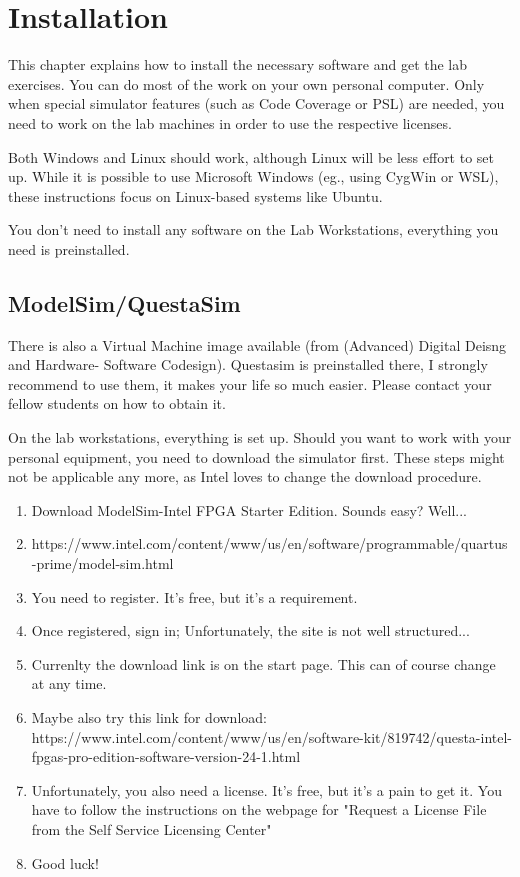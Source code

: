 \documentclass[12pt,epsf,makeidx,oneside]{book}
\begin{document}
\chapter{Installation}
This chapter explains how to install the necessary software and get the lab exercises. You can do most of the work on your own personal computer. Only when special simulator features (such as Code Coverage or PSL) are needed, you need to work on the lab machines in order to use the respective licenses. 

Both Windows and Linux should work, although Linux will be less effort to set up. While it is possible to use Microsoft Windows (eg., using CygWin or WSL), these instructions focus on Linux-based systems like Ubuntu. 

You don't need to install any software on the Lab Workstations, everything you need is preinstalled.

\section{ModelSim/QuestaSim}
  There is also a Virtual Machine image available (from (Advanced) Digital Deisng and Hardware- Software Codesign). Questasim is preinstalled there, I strongly recommend to use them, it makes your life so much easier. Please contact your fellow students on how to obtain it.
  
  On the lab workstations, everything is set up. Should you want to work with your personal equipment, you need to download the simulator first. These steps might not be applicable any more, as Intel loves to change the download procedure.
  \begin{enumerate}[noitemsep]
    \item Download ModelSim-Intel FPGA Starter Edition. Sounds easy? Well...
    \item https://www.intel.com/content/www/us/en/software/programmable/quartus-prime/model-sim.html
    \item You need to register. It's free, but it's a requirement.
    \item Once registered, sign in; Unfortunately, the site is not well structured...
    \item Currenlty the download link is on the start page. This can of course change at any time. 
    \item Maybe also try this link for download: https://www.intel.com/content/www/us/en/software-kit/819742/questa-intel-fpgas-pro-edition-software-version-24-1.html
    \item Unfortunately, you also need a license. It's free, but it's a pain to get it. You have to follow the instructions on the webpage for "Request a License File from the Self Service Licensing Center"
    \item Good luck!
  \end{enumerate}
  
\end{document}
